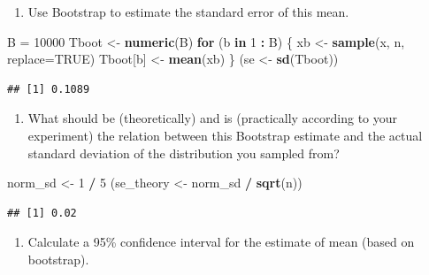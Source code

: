 \documentclass[
]{article}
\newenvironment{Shaded}{\begin{snugshade}}{\end{snugshade}}
\newcommand{\ControlFlowTok}[1]{\textcolor[rgb]{0.13,0.29,0.53}{\textbf{#1}}}
\newcommand{\DataTypeTok}[1]{\textcolor[rgb]{0.13,0.29,0.53}{#1}}
\newcommand{\DecValTok}[1]{\textcolor[rgb]{0.00,0.00,0.81}{#1}}
\newcommand{\KeywordTok}[1]{\textcolor[rgb]{0.13,0.29,0.53}{\textbf{#1}}}
\newcommand{\NormalTok}[1]{#1}
\newcommand{\OperatorTok}[1]{\textcolor[rgb]{0.81,0.36,0.00}{\textbf{#1}}}
\newcommand{\OtherTok}[1]{\textcolor[rgb]{0.56,0.35,0.01}{#1}}
\newcommand{\StringTok}[1]{\textcolor[rgb]{0.31,0.60,0.02}{#1}}
\providecommand{\tightlist}{%
  \setlength{\itemsep}{0pt}\setlength{\parskip}{0pt}}
\begin{document}
\begin{enumerate}
\def\labelenumi{\arabic{enumi}.}
\setcounter{enumi}{2}
\tightlist
\item
  Use Bootstrap to estimate the standard error of this mean.
\end{enumerate}

\begin{Shaded}
\begin{Highlighting}[]
\NormalTok{B =}\StringTok{ }\DecValTok{10000}
\NormalTok{Tboot <-}\StringTok{ }\KeywordTok{numeric}\NormalTok{(B)}
\ControlFlowTok{for}\NormalTok{ (b }\ControlFlowTok{in} \DecValTok{1} \OperatorTok{:}\StringTok{ }\NormalTok{B) \{}
\NormalTok{  xb <-}\StringTok{ }\KeywordTok{sample}\NormalTok{(x, n, }\DataTypeTok{replace=}\OtherTok{TRUE}\NormalTok{)}
\NormalTok{  Tboot[b] <-}\StringTok{ }\KeywordTok{mean}\NormalTok{(xb)}
\NormalTok{\}}
\NormalTok{(se <-}\StringTok{ }\KeywordTok{sd}\NormalTok{(Tboot))}
\end{Highlighting}
\end{Shaded}

\begin{verbatim}
## [1] 0.1089
\end{verbatim}

\begin{enumerate}
\def\labelenumi{\arabic{enumi}.}
\setcounter{enumi}{3}
\tightlist
\item
  What should be (theoretically) and is (practically according to your
  experiment) the relation between this Bootstrap estimate and the
  actual standard deviation of the distribution you sampled from?
\end{enumerate}

\begin{Shaded}
\begin{Highlighting}[]
\NormalTok{norm_sd <-}\StringTok{ }\DecValTok{1} \OperatorTok{/}\StringTok{ }\DecValTok{5}
\NormalTok{(se_theory <-}\StringTok{ }\NormalTok{norm_sd }\OperatorTok{/}\StringTok{ }\KeywordTok{sqrt}\NormalTok{(n))}
\end{Highlighting}
\end{Shaded}

\begin{verbatim}
## [1] 0.02
\end{verbatim}

\begin{enumerate}
\def\labelenumi{\arabic{enumi}.}
\setcounter{enumi}{4}
\tightlist
\item
  Calculate a 95\% confidence interval for the estimate of mean (based
  on bootstrap).
\end{enumerate}
\end{document}
